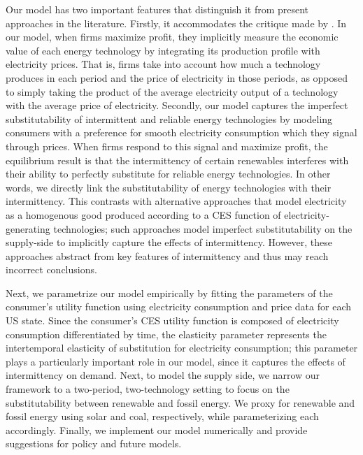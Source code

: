 \documentclass[11pt,a4paper,leqno]{extarticle}
\begin{document}
	Our model has two important features that distinguish it from present approaches in the literature. Firstly, it accommodates the critique made by \citet{Joskow2011}. In our model, when firms maximize profit, they implicitly measure the economic value of each energy technology by integrating its production profile with electricity prices. That is, firms take into account how much a technology produces in each period and the price of electricity in those periods, as opposed to simply taking the product of the average electricity output of a technology with the average price of electricity. Secondly, our model captures the imperfect substitutability of intermittent and reliable energy technologies  by modeling consumers with a preference for smooth electricity consumption which they signal through prices. When firms respond to this signal and maximize profit, the equilibrium result  is that the intermittency of certain renewables interferes with their ability to perfectly substitute for reliable energy technologies. In other words, we directly link the substitutability of energy technologies with their intermittency. 
	This contrasts with alternative approaches that model electricity as a homogenous good produced according to  a CES function of electricity-generating technologies; such approaches model imperfect substitutability on the supply-side to implicitly capture the effects of intermittency. However, these approaches abstract from key features of intermittency and thus may reach incorrect conclusions. 
	
	Next, we parametrize our model empirically by fitting the parameters of the consumer's utility function using electricity consumption and price data for each US state. Since the consumer's CES utility function is composed of electricity consumption differentiated by time, the elasticity parameter represents the intertemporal elasticity of substitution for electricity consumption; this parameter plays a particularly important role in our model, since it captures the effects of intermittency on demand. Next, to model the supply side, we narrow our framework to a two-period, two-technology setting to focus on the substitutability between renewable and fossil energy. We proxy for renewable and fossil energy using solar and coal, respectively, while parameterizing each accordingly. Finally, we implement our model numerically and provide suggestions for policy and future models. 
	
\end{document}
